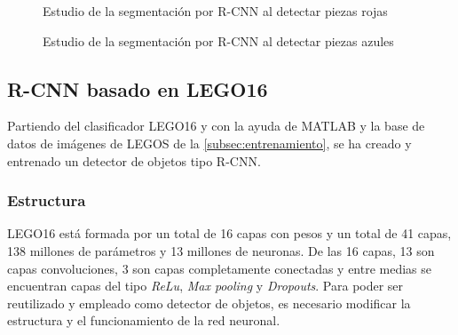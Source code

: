 \begin{figure}[ht]  %
\vspace{-30pt}
  \hfill	
\vspace{-15pt}
\caption{Estudio de la segmentación por R-CNN al detectar piezas rojas}
\label{fig:red R-CNN}
\end{figure}

\begin{figure}[H]  %
\vspace{-30pt}
  \hfill	
\vspace{-15pt}
\caption{Estudio de la segmentación por R-CNN al detectar piezas azules}
\label{fig:blue R-CNN}
\end{figure}


\subsection{R-CNN basado en LEGO16}
Partiendo del clasificador LEGO16 y con la ayuda de MATLAB y la base de datos de imágenes de LEGOS de la \autoref{subsec:entrenamiento}, se ha creado y entrenado un detector de objetos tipo R-CNN.

\subsubsection*{Estructura}
LEGO16 está formada por un total de 16 capas con pesos y un total de 41 capas, 138 millones de parámetros y 13 millones de neuronas. De las 16 capas, 13 son capas convoluciones, 3 son capas completamente conectadas y entre medias se encuentran capas del tipo \textit{ReLu}, \textit{Max pooling} y \textit{Dropouts}. Para poder ser reutilizado y empleado como detector de objetos, es necesario modificar la estructura y el funcionamiento de la red neuronal.

